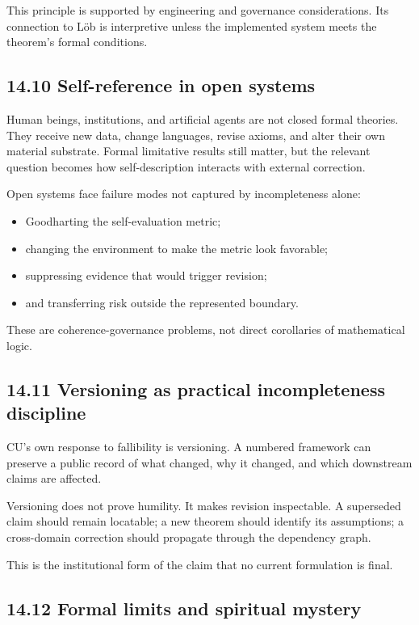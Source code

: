 \documentclass[
  11pt,
]{article}
\providecommand{\tightlist}{%
  \setlength{\itemsep}{0pt}\setlength{\parskip}{0pt}}
\begin{document}
This principle is supported by engineering and governance
considerations. Its connection to Löb is interpretive unless the
implemented system meets the theorem's formal conditions.

\subsection{14.10 Self-reference in open
systems}\label{self-reference-in-open-systems}

Human beings, institutions, and artificial agents are not closed formal
theories. They receive new data, change languages, revise axioms, and
alter their own material substrate. Formal limitative results still
matter, but the relevant question becomes how self-description interacts
with external correction.

Open systems face failure modes not captured by incompleteness alone:

\begin{itemize}
\tightlist
\item
  Goodharting the self-evaluation metric;
\item
  changing the environment to make the metric look favorable;
\item
  suppressing evidence that would trigger revision;
\item
  and transferring risk outside the represented boundary.
\end{itemize}

These are coherence-governance problems, not direct corollaries of
mathematical logic.

\subsection{14.11 Versioning as practical incompleteness
discipline}\label{versioning-as-practical-incompleteness-discipline}

CU's own response to fallibility is versioning. A numbered framework can
preserve a public record of what changed, why it changed, and which
downstream claims are affected.

Versioning does not prove humility. It makes revision inspectable. A
superseded claim should remain locatable; a new theorem should identify
its assumptions; a cross-domain correction should propagate through the
dependency graph.

This is the institutional form of the claim that no current formulation
is final.

\subsection{14.12 Formal limits and spiritual
mystery}\label{formal-limits-and-spiritual-mystery}
\end{document}
